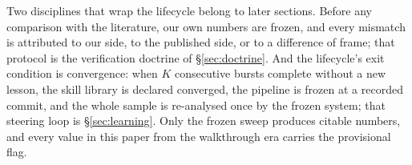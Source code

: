 Two disciplines that wrap the lifecycle belong to later sections. Before
any comparison with the literature, our own numbers are frozen, and every
mismatch is attributed to our side, to the published side, or to a
difference of frame; that protocol is the verification doctrine of
\S\ref{sec:doctrine}. And the lifecycle's exit condition is convergence:
when $K$ consecutive bursts complete without a new lesson, the skill
library is declared converged, the pipeline is frozen at a recorded commit,
and the whole sample is re-analysed once by the frozen system; that
steering loop is \S\ref{sec:learning}. Only the frozen sweep produces
citable numbers, and every value in this paper from the walkthrough era
carries the provisional flag\prov.
